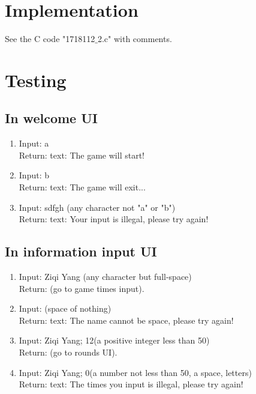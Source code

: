 \documentclass[12pt]{article}
\begin{document}
	\section{Implementation}
	See the C code "1718112$\_$2.c" with comments.
	
	\section{Testing}
	
	\subsection{In welcome UI}
		
		\begin{enumerate}[$\bullet$]
			\item Input: a\\
			Return: text: The game will start!
			\item Input: b\\
			Return: text: The game will exit...
			\item Input: sdfgh (any character not "a" or "b")\\
			Return: text: Your input is illegal, please try again!
		\end{enumerate}
	
	\subsection{In information input UI}
		
		\begin{enumerate}[$\bullet$]
			\item Input: Ziqi Yang (any character but full-space)\\
			Return: (go to game times input).
			\item Input: (space of nothing)\\
			Return: text: The name cannot be space, please try again!
			\item Input: Ziqi Yang; 12(a positive integer less than 50)\\
			Return: (go to rounds UI).
			\item Input: Ziqi Yang; 0(a number not less than 50, a space, letters)\\
			Return: text: The times you input is illegal, please try again!
		\end{enumerate}
	
\end{document}
